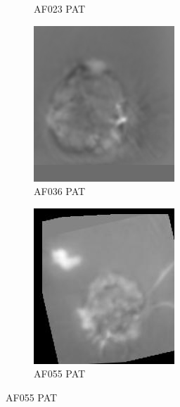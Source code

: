 \begin{figure}
\begin{subfigure}[b]{.24\linewidth}
\caption{AF023 PAT}
\end{subfigure}
\begin{subfigure}[b]{.24\linewidth}
\includegraphics[width=\linewidth]{Figs/PAT36.png}
\caption{AF036 PAT}
\end{subfigure}
\begin{subfigure}[b]{.24\linewidth}
\includegraphics[width=\linewidth]{Figs/PAT055_11.jpg}
\caption{AF055 PAT}
\end{subfigure}


\end{figure}
